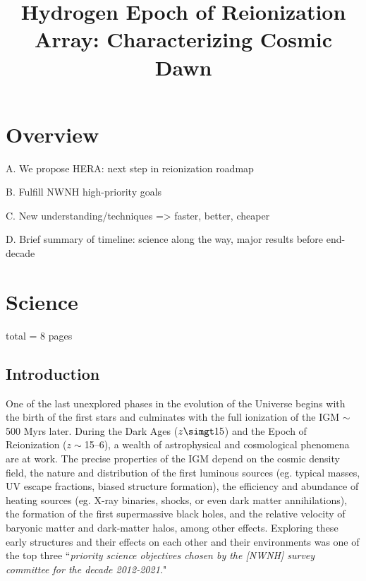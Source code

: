 \documentclass[preprint]{aastex}
\begin{document}
\title{Hydrogen Epoch of Reionization Array: Characterizing Cosmic Dawn}

\section{Overview} %

A. We propose HERA: next step in reionization roadmap

B. Fulfill NWNH high-priority goals

C. New understanding/techniques => faster, better, cheaper

D. Brief summary of timeline: science along the way, major results before end-decade

\section{Science} total = 8 pages

\subsection{Introduction}    %


One of the last unexplored phases in the evolution of the Universe
begins with the birth of the first stars and culminates with the full
ionization of the IGM $\sim$500 Myrs later. During the Dark Ages
($z\simgt15$) and the Epoch of Reionization ($z\sim$15--6), a wealth
of astrophysical and cosmological phenomena are at work. The precise
properties of the IGM depend on the cosmic density field, the nature
and distribution of the first luminous sources (eg. typical masses, UV
escape fractions, biased structure formation), the efficiency and
abundance of heating sources (eg. X-ray binaries, shocks, or even dark
matter annihilations), the formation of the first supermassive black
holes, and the relative velocity of baryonic matter and dark-matter
halos, among other effects.  Exploring these early structures and
their effects on each other and their environments was one of the top
three ``{\it priority science objectives chosen by the [NWNH] survey
committee for the decade 2012-2021.}"
\end{document}
